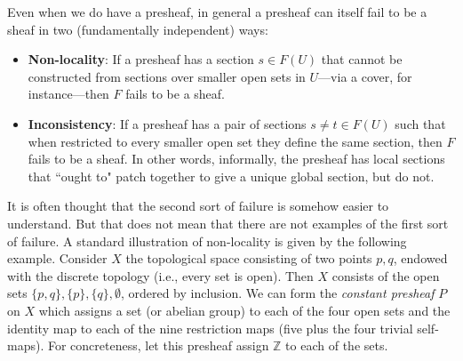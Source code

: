 \documentclass[11pt]{book}
\theoremstyle{definition}
\theoremstyle{definition}
\theoremstyle{definition}
\theoremstyle{theorem}
\theoremstyle{definition}
\begin{document}
\par    
Even when we do have a presheaf, in general a presheaf can itself fail to be a sheaf in two (fundamentally independent) ways:  
\begin{itemize}
	\item \textbf{Non-locality}: If a presheaf has a section $s \in F(U)$ that cannot be constructed from sections over smaller open sets in $U$---via a cover, for instance---then $F$ fails to be a sheaf. 
	\item \textbf{Inconsistency}: If a presheaf has a pair of sections $s \neq t \in F(U)$ such that when restricted to every smaller open set they define the same section, then $F$ fails to be a sheaf. In other words, informally, the presheaf has local sections that ``ought to" patch together to give a unique global section, but do not.  
\end{itemize}
It is often thought that the second sort of failure is somehow easier to understand. But that does not mean that there are not examples of the first sort of failure. A standard illustration of non-locality is given by the following example. Consider $X$ the topological space consisting of two points $p, q$, endowed with the discrete topology (i.e., every set is open). Then $X$ consists of the open sets $\{p,q\}, \{p\}, \{q\}, \emptyset$, ordered by inclusion. We can form the \textit{constant presheaf} $P$ on $X$ which assigns a set (or abelian group) to each of the four open sets and the identity map to each of the nine restriction maps (five plus the four trivial self-maps). For concreteness, let this presheaf assign $\mathbb{Z}$ to each of the sets.     
\begin{center} 
\end{center} 
\end{document}
